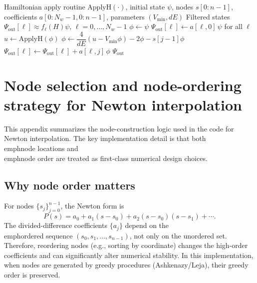 \begin{algorithm}[t]
\caption{Shared Newton--Horner Filter Application for Multiple Windows}
\label{alg:shared_filter}
\begin{algorithmic}[1]
\Require Hamiltonian apply routine $\mathrm{ApplyH}(\cdot)$, initial state $\psi$,
         nodes $s[0{:}n-1]$, coefficients $a[0{:}N_w-1,0{:}n-1]$, parameters $(V_{\min},dE)$
\Ensure Filtered states $\Psi_{\mathrm{out}}[\ell] \approx f_\ell(H)\psi$, $\ell=0,\dots,N_w-1$
\State $\phi \gets \psi$
\State $\Psi_{\mathrm{out}}[\ell] \gets a[\ell,0]\,\psi$ for all $\ell$
    \State $u \gets \mathrm{ApplyH}(\phi)$
    \State $\phi \gets \dfrac{4}{dE}(u - V_{\min}\phi) - 2\phi - s[j-1]\phi$
        \State $\Psi_{\mathrm{out}}[\ell] \gets \Psi_{\mathrm{out}}[\ell] + a[\ell,j]\,\phi$
    \EndFor
\EndFor
\State \Return $\Psi_{\mathrm{out}}$
\end{algorithmic}
\end{algorithm}

\appendix
\section{Node selection and node-ordering strategy for Newton interpolation}
\label{app:nodes}

This appendix summarizes the node-construction logic used in the code for
Newton interpolation. The key implementation detail is that both
\\emph{node locations} and \\emph{node order} are treated as first-class
numerical design choices.

\subsection{Why node order matters}

For nodes $\{s_j\}_{j=0}^{n-1}$, the Newton form is
\begin{equation}
P(s)=a_0+a_1(s-s_0)+a_2(s-s_0)(s-s_1)+\cdots .
\end{equation}
The divided-difference coefficients $\{a_j\}$ depend on the \\emph{ordered}
sequence $(s_0,s_1,\ldots,s_{n-1})$, not only on the unordered set.
Therefore, reordering nodes (e.g., sorting by coordinate) changes the
high-order coefficients and can significantly alter numerical stability.
In this implementation, when nodes are generated by greedy procedures
(Ashkenazy/Leja), their greedy order is preserved.

